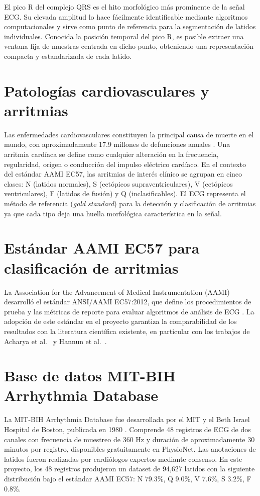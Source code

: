 \documentclass[11pt,spanish]{citedi}
\begin{document}
El pico R del complejo QRS es el hito morfológico más prominente de la señal ECG. Su elevada amplitud lo hace fácilmente identificable mediante algoritmos computacionales y sirve como punto de referencia para la segmentación de latidos individuales. Conocida la posición temporal del pico R, es posible extraer una ventana fija de muestras centrada en dicho punto, obteniendo una representación compacta y estandarizada de cada latido.

\section{Patologías cardiovasculares y arritmias}

Las enfermedades cardiovasculares constituyen la principal causa de muerte en el mundo, con aproximadamente 17.9 millones de defunciones anuales \cite{WHO2024}. Una arritmia cardíaca se define como cualquier alteración en la frecuencia, regularidad, origen o conducción del impulso eléctrico cardíaco. En el contexto del estándar AAMI EC57, las arritmias de interés clínico se agrupan en cinco clases: N (latidos normales), S (ectópicos supraventriculares), V (ectópicos ventriculares), F (latidos de fusión) y Q (inclasificables). El ECG representa el método de referencia (\textit{gold standard}) para la detección y clasificación de arritmias ya que cada tipo deja una huella morfológica característica en la señal.

\section{Estándar AAMI EC57 para clasificación de arritmias}

La Association for the Advancement of Medical Instrumentation (AAMI) desarrolló el estándar ANSI/AAMI EC57:2012, que define los procedimientos de prueba y las métricas de reporte para evaluar algoritmos de análisis de ECG \cite{AAMI2012}. La adopción de este estándar en el proyecto garantiza la comparabilidad de los resultados con la literatura científica existente, en particular con los trabajos de Acharya et al.\ \cite{Acharya2017} y Hannun et al.\ \cite{Hannun2019}.

\section{Base de datos MIT-BIH Arrhythmia Database}

La MIT-BIH Arrhythmia Database fue desarrollada por el MIT y el Beth Israel Hospital de Boston, publicada en 1980 \cite{Moody2001}. Comprende 48 registros de ECG de dos canales con frecuencia de muestreo de 360 Hz y duración de aproximadamente 30 minutos por registro, disponibles gratuitamente en PhysioNet. Las anotaciones de latidos fueron realizadas por cardiólogos expertos mediante consenso. En este proyecto, los 48 registros produjeron un dataset de 94,627 latidos con la siguiente distribución bajo el estándar AAMI EC57: N 79.3\%, Q 9.0\%, V 7.6\%, S 3.2\%, F 0.8\%.
\end{document}
